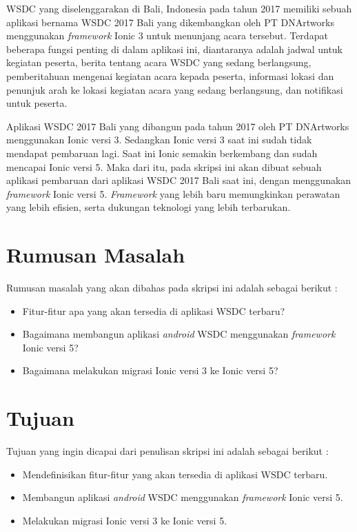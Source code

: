 WSDC yang diselenggarakan di Bali, Indonesia pada tahun 2017 memiliki sebuah aplikasi bernama WSDC 2017 Bali yang dikembangkan oleh PT DNArtworks menggunakan \textit{framework} Ionic 3 untuk menunjang acara tersebut. Terdapat beberapa fungsi penting di dalam aplikasi ini, diantaranya adalah jadwal untuk kegiatan peserta, berita tentang acara WSDC yang sedang berlangsung, pemberitahuan mengenai kegiatan acara kepada peserta, informasi lokasi dan penunjuk arah ke lokasi kegiatan acara yang sedang berlangsung, dan notifikasi untuk peserta. 

\newpage

Aplikasi WSDC 2017 Bali yang dibangun pada tahun 2017 oleh PT DNArtworks menggunakan Ionic versi 3. Sedangkan Ionic versi 3 saat ini sudah tidak mendapat pembaruan lagi. Saat ini Ionic semakin berkembang dan sudah mencapai Ionic versi 5. Maka dari itu, pada skripsi ini akan dibuat sebuah aplikasi pembaruan dari aplikasi WSDC 2017 Bali saat ini, dengan menggunakan \textit{framework} Ionic versi 5. \textit{Framework} yang lebih baru memungkinkan perawatan yang lebih efisien, serta dukungan teknologi yang lebih terbarukan.

\section{Rumusan Masalah}
\label{sec:rumusan}
Rumusan masalah yang akan dibahas pada skripsi ini adalah sebagai berikut :
\begin{itemize}
	\item Fitur-fitur apa yang akan tersedia di aplikasi WSDC terbaru?
	\item Bagaimana membangun aplikasi {\it android} WSDC menggunakan {\it framework} Ionic versi 5?
	\item Bagaimana melakukan migrasi Ionic versi 3 ke Ionic versi 5?
\end{itemize}


\section{Tujuan}
\label{sec:tujuan}
Tujuan yang ingin dicapai dari penulisan skripsi ini adalah sebagai berikut :
\begin{itemize}
	\item Mendefinisikan fitur-fitur yang akan tersedia di aplikasi WSDC terbaru.
	\item Membangun aplikasi {\it android} WSDC menggunakan {\it framework} Ionic versi 5.
	\item Melakukan migrasi Ionic versi 3 ke Ionic versi 5.
\end{itemize}


